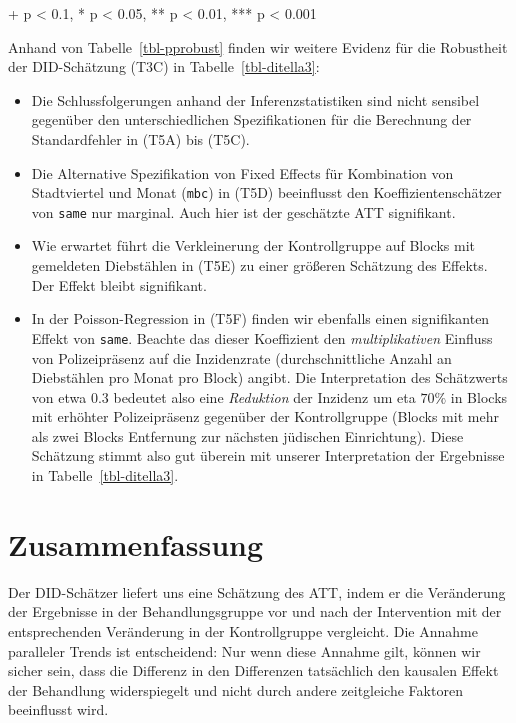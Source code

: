 \documentclass[
  a4paper,
  DIV=11,
  oneside]{scrreprt}
\begin{document}
\begin{minipage}{\linewidth}
+ p < 0.1, * p < 0.05, ** p < 0.01, *** p < 0.001\\
\end{minipage}

Anhand von Tabelle~\ref{tbl-pprobust} finden wir weitere Evidenz für die
Robustheit der DID-Schätzung (T3C) in Tabelle~\ref{tbl-ditella3}:

\begin{itemize}
\item
  Die Schlussfolgerungen anhand der Inferenzstatistiken sind nicht
  sensibel gegenüber den unterschiedlichen Spezifikationen für die
  Berechnung der Standardfehler in (T5A) bis (T5C).
\item
  Die Alternative Spezifikation von Fixed Effects für Kombination von
  Stadtviertel und Monat (\texttt{mbc}) in (T5D) beeinflusst den
  Koeffizientenschätzer von \texttt{same} nur marginal. Auch hier ist
  der geschätzte ATT signifikant.
\item
  Wie erwartet führt die Verkleinerung der Kontrollgruppe auf Blocks mit
  gemeldeten Diebstählen in (T5E) zu einer größeren Schätzung des
  Effekts. Der Effekt bleibt signifikant.
\item
  In der Poisson-Regression in (T5F) finden wir ebenfalls einen
  signifikanten Effekt von \texttt{same}. Beachte das dieser Koeffizient
  den \emph{multiplikativen} Einfluss von Polizeipräsenz auf die
  Inzidenzrate (durchschnittliche Anzahl an Diebstählen pro Monat pro
  Block) angibt. Die Interpretation des Schätzwerts von etwa \(0.3\)
  bedeutet also eine \emph{Reduktion} der Inzidenz um eta \(70\%\) in
  Blocks mit erhöhter Polizeipräsenz gegenüber der Kontrollgruppe
  (Blocks mit mehr als zwei Blocks Entfernung zur nächsten jüdischen
  Einrichtung). Diese Schätzung stimmt also gut überein mit unserer
  Interpretation der Ergebnisse in Tabelle~\ref{tbl-ditella3}.
\end{itemize}

\section{Zusammenfassung}\label{zusammenfassung}

Der DID-Schätzer liefert uns eine Schätzung des ATT, indem er die
Veränderung der Ergebnisse in der Behandlungsgruppe vor und nach der
Intervention mit der entsprechenden Veränderung in der Kontrollgruppe
vergleicht. Die Annahme paralleler Trends ist entscheidend: Nur wenn
diese Annahme gilt, können wir sicher sein, dass die Differenz in den
Differenzen tatsächlich den kausalen Effekt der Behandlung widerspiegelt
und nicht durch andere zeitgleiche Faktoren beeinflusst wird.
\end{document}
